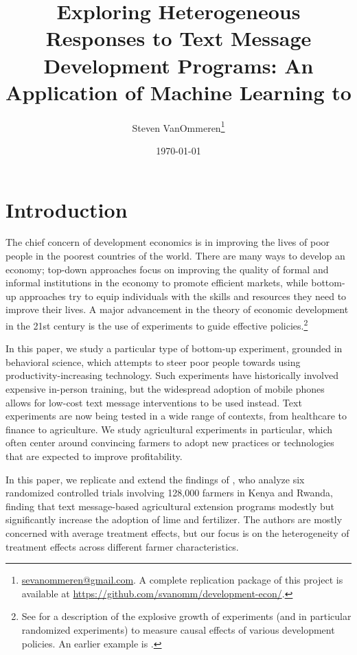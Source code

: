 \documentclass[12pt]{article}
\begin{document}
\title{Exploring Heterogeneous Responses to Text Message Development Programs: An Application of Machine Learning to \textcite{fabregas_digital_2025}}
\author{Steven VanOmmeren\thanks{\href{mailto:sevanommeren@gmail.com}{sevanommeren@gmail.com}. A complete replication package of this project is available at \url{https://github.com/svanomm/development-econ/}.}}
\date{\today}
\maketitle
\noindent
\tableofcontents
\newpage

\doublespacing

\section{Introduction}

The chief concern of development economics is in improving the lives of poor people in the poorest countries of the world. There are many ways to develop an economy; top-down approaches focus on improving the quality of formal and informal institutions in the economy to promote efficient markets, while bottom-up approaches try to equip individuals with the skills and resources they need to improve their lives. A major advancement in the theory of economic development in the 21st century is the use of experiments to guide effective policies.\footnote{See \textcite{basu_influence_2020} for a description of the explosive growth of experiments (and in particular randomized experiments) to measure causal effects of various development policies. An earlier example is \textcite{duflo_use_2003}.} 

In this paper, we study a particular type of bottom-up experiment, grounded in behavioral science, which attempts to steer poor people towards using productivity-increasing technology. Such experiments have historically involved expensive in-person training, but the widespread adoption of mobile phones allows for low-cost text message interventions to be used instead. Text experiments are now being tested in a wide range of contexts, from healthcare to finance to agriculture. We study agricultural experiments in particular, which often center around convincing farmers to adopt new practices or technologies that are expected to improve profitability.

In this paper, we replicate and extend the findings of \textcite{fabregas_digital_2025}, who analyze six randomized controlled trials involving 128,000 farmers in Kenya and Rwanda, finding that text message-based agricultural extension programs modestly but significantly increase the adoption of lime and fertilizer. The authors are mostly concerned with average treatment effects, but our focus is on the heterogeneity of treatment effects across different farmer characteristics.
\end{document}
